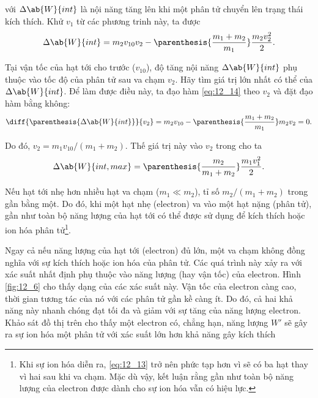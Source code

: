 \noindent
với $\Delta{\ab{W}{int}}$ là nội năng tăng lên khi một phân tử chuyển lên trạng thái kích thích.
Khử $v_1$ từ các phương trinh này, ta được
\begin{equation}\label{eq:12_14}
    \Delta{\ab{W}{int}} = m_2 v_{10} v_2 - \parenthesis{\frac{m_1 + m_2}{m_1}} \frac{m_2v_2^2}{2}.
\end{equation}

Tại vận tốc của hạt tới cho trước ($v_{10}$), độ tăng nội năng $\Delta{\ab{W}{int}}$ phụ thuộc vào tốc độ của phân tử sau va chạm $v_2$.
Hãy tìm giá trị lớn nhất có thể của $\Delta{\ab{W}{int}}$.
Để làm được điều này, ta đạo hàm \eqref{eq:12_14} theo $v_2$ và đặt đạo hàm bằng không:
\begin{equation*}
    \diff{\parenthesis{\Delta{\ab{W}{int}}}}{v_2} = m_2 v_{10} - \parenthesis{\frac{m_1 + m_2}{m_1}} m_2v_2 = 0.
\end{equation*}

\noindent
Do đó, $v_2 = m_1v_{10}/(m_1+m_2)$.
Thế giá trị này vào $v_2$ trong  cho ta
\begin{equation}\label{eq:12_15}
    \Delta{\ab{W}{int,max}} = \parenthesis{\frac{m_2}{m_1+m_2}} \frac{m_1v_1^2}{2}.
\end{equation}

Nếu hạt tới nhẹ hơn nhiều hạt va chạm ($m_1 \ll m_2$), tỉ số $m_2/(m_1+m_2)$ trong  gần bằng một.
Do đó, khi một hạt nhẹ (electron) va vào một hạt nặng (phân tử), gần như toàn bộ năng lượng của hạt tới có thể được sử dụng để kích thích hoặc ion hóa phân tử\footnote{Khi sự ion hóa diễn ra, \eqref{eq:12_13} trở nên phức tạp hơn vì sẽ có ba hạt thay vì hai sau khi va chạm. Mặc dù vậy, kết luận rằng gần như toàn bộ năng lượng của electron được dành cho sự ion hóa vẫn có hiệu lực.}.

Ngay cả nếu năng lượng của hạt tới (electron) đủ lớn, một va chạm không đồng nghĩa với sự kích thích hoặc ion hóa của phân tử.
Các quá trình này xảy ra với xác suất nhất định phụ thuộc vào năng lượng (hay vận tốc) của electron.
Hình \ref{fig:12_6} cho thấy dạng của các xác suất này.
Vận tốc của electron càng cao, thời gian tương tác của nó với các phân tử gần kề càng ít.
Do đó, cả hai khả năng này nhanh chóng đạt tối đa và giảm với sự tăng của năng lượng electron.
Khảo sát đồ thị trên cho thấy một electron có, chẳng hạn, năng lượng $W'$ sẽ gây ra sự ion hóa một phân tử với xác suất lớn hơn khả năng gây kích thích

